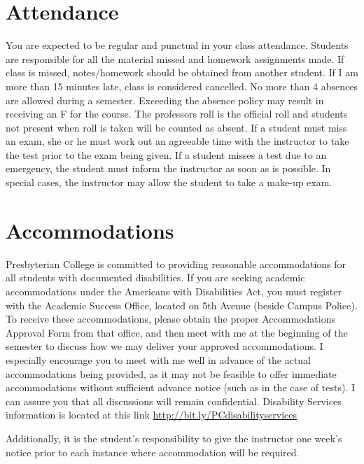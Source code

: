 \documentclass[
]{book}
\theoremstyle{definition}
\theoremstyle{definition}
\theoremstyle{definition}
\theoremstyle{definition}
\theoremstyle{remark}
\begin{document}
\hypertarget{attendance}{%
\section{Attendance}\label{attendance}}

You are expected to be regular and punctual in your class attendance. Students are responsible for all the material missed and homework assignments made. If class is missed, notes/homework should be obtained from another student. If I am more than 15 minutes late, class is considered cancelled. No more than 4 absences are allowed during a semester. Exceeding the absence policy may result in receiving an F for the course. The professors roll is the official roll and students not present when roll is taken will be counted as absent. If a student must miss an exam, she or he must work out an agreeable time with the instructor to take the test prior to the exam being given. If a student misses a test due to an emergency, the student must inform the instructor as soon as is possible. In special cases, the instructor may allow the student to take a make-up exam.

\hypertarget{accommodations}{%
\section{Accommodations}\label{accommodations}}

Presbyterian College is committed to providing reasonable accommodations for all students with documented disabilities. If you are seeking academic accommodations under the Americans with Disabilities Act, you must register with the Academic Success Office, located on 5th Avenue (beside Campus Police). To receive these accommodations, please obtain the proper Accommodations Approval Form from that office, and then meet with me at the beginning of the semester to discuss how we may deliver your approved accommodations. I especially encourage you to meet with me well in advance of the actual accommodations being provided, as it may not be feasible to offer immediate accommodations without sufficient advance notice (such as in the case of tests). I can assure you that all discussions will remain confidential. Disability Services information is located at this link \url{http://bit.ly/PCdisabilityservices}

Additionally, it is the student's responsibility to give the instructor one week's notice prior to each instance where accommodation will be required.
\end{document}
